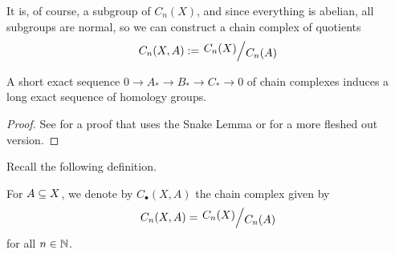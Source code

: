 It is, of course, a subgroup of $C_n(X)$, and since everything is abelian, all subgroups are normal, so we can construct a chain complex of quotients
\begin{align*}
    C_n\of{X, A} := \quotient{C_n(X)}{C_n(A)}
\end{align*}
\begin{boxtheorem}\label{SP:Thm:LES_Homology}
    A short exact sequence $0\rightarrow A_{*}\rightarrow B_{*}\rightarrow C_{*} \to 0$ of chain complexes induces a long exact sequence of homology groups.
\end{boxtheorem}
\begin{proof}
    See \cite[Week 6, Lemma 1.6]{ICLAlg4} for a proof that uses the Snake Lemma or \cite[Proposition 5.5.1]{EPFLRingsAndModules} for a more fleshed out version.
\end{proof}

Recall the following definition.

\begin{boxdefinition}
    For $A \subseteq X$, we denote by $C_{\bullet}(X, A)$ the chain complex given by
    \begin{align*}
        C_n(X, A) = \quotient{C_n(X)}{C_n(A)}
    \end{align*}
    for all $n \in \mathbb{N}$.
\end{boxdefinition}

